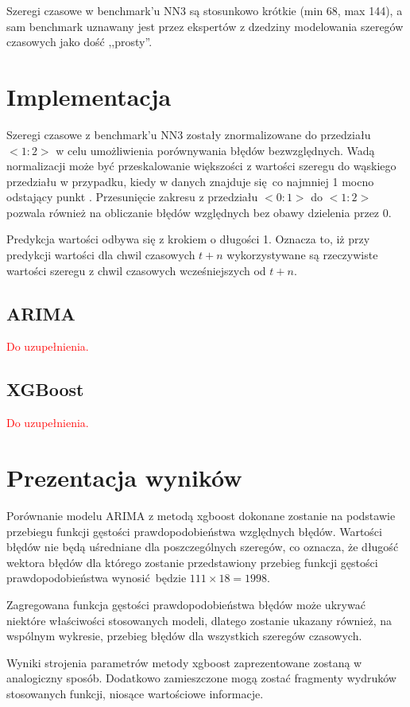 \documentclass[11pt]{report}
\begin{document}
Szeregi czasowe w benchmark'u NN3 są stosunkowo krótkie (min 68, max 144), a sam benchmark uznawany jest przez ekspertów z dzedziny modelowania szeregów czasowych jako dość ,,prosty''.

\section{Implementacja}

Szeregi czasowe z benchmark'u NN3 zostały znormalizowane do przedziału $<1:2>$ w celu umożliwienia porównywania błędów bezwzględnych.
Wadą normalizacji może być przeskalowanie większości z wartości szeregu do wąskiego przedziału w przypadku, kiedy w danych znajduje się co najmniej 1 mocno odstający punkt \cite{noauthor_standardization_nodate}.
Przesunięcie zakresu z przedziału $<0:1>$ do $<1:2>$ pozwala również na obliczanie błędów względnych bez obawy dzielenia przez 0.

Predykcja wartości odbywa się z krokiem o długości 1.
Oznacza to, iż przy predykcji wartości dla chwil czasowych $t+n$ wykorzystywane są rzeczywiste wartości szeregu z chwil czasowych wcześniejszych od $t+n$.

\subsection{ARIMA}
\textcolor{red}{Do uzupełnienia.}

\subsection{XGBoost}
\textcolor{red}{Do uzupełnienia.}

\section{Prezentacja wyników}
\color{red}
Porównanie modelu ARIMA z metodą xgboost dokonane zostanie na podstawie przebiegu funkcji gęstości prawdopodobieństwa względnych błędów.
Wartości błędów nie będą uśredniane dla poszczególnych szeregów, co oznacza, że długość wektora błędów dla którego zostanie przedstawiony przebieg funkcji gęstości prawdopodobieństwa wynosić będzie $111 \times 18 = 1998$.

Zagregowana funkcja gęstości prawdopodobieństwa błędów może ukrywać niektóre właściwości stosowanych modeli, dlatego zostanie ukazany również, na wspólnym  wykresie, przebieg błędów dla wszystkich szeregów czasowych.

Wyniki strojenia parametrów metody xgboost zaprezentowane zostaną w analogiczny sposób.
Dodatkowo zamieszczone mogą zostać fragmenty wydruków stosowanych funkcji, niosące wartościowe informacje.



\end{document}
